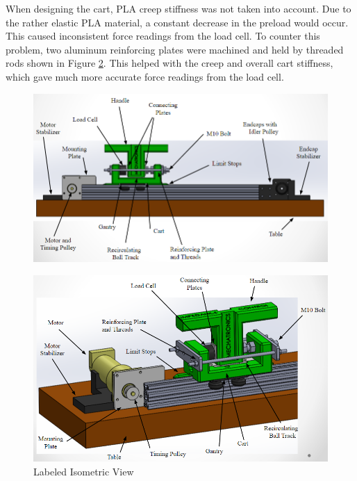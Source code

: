 When designing the cart, PLA creep stiffness was not taken into account. Due to the rather elastic PLA material, a constant decrease in the preload would occur. This caused inconsistent force readings from the load cell. To counter this problem, two aluminum reinforcing plates were machined and held by threaded rods shown in Figure \ref{fig:Annotated_Iso}. This helped with the creep and overall cart stiffness, which gave much more accurate force readings from the load cell.
\begin{figure}[h]
	\centering
	\includegraphics[width=1\linewidth]{Images/Annotated_Front}
	\caption{}
	\label{fig:Annotated_Front}
\end{figure}
\begin{figure}[h]	
\centering
\includegraphics[width=1\linewidth]{Images/Annotated_Iso}
\caption{Labeled Isometric View}
\label{fig:Annotated_Iso}
\end{figure}
